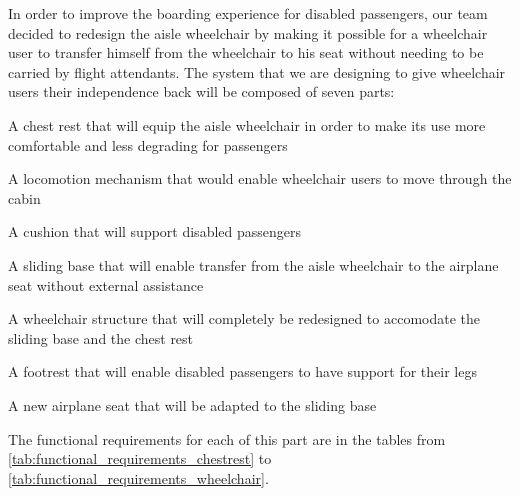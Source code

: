 In order to improve the boarding experience for disabled passengers, our team decided to redesign the aisle wheelchair by making it possible for a wheelchair user to transfer himself from the wheelchair to his seat without needing to be carried by flight attendants. The system that we are designing to give wheelchair users their independence back will be composed of seven parts:

\begin{list}{-}{}
  \item A chest rest that will equip the aisle wheelchair in order to make its use more comfortable and less degrading for passengers
  \item A locomotion mechanism that would enable wheelchair users to move through the cabin
  \item A cushion that will support disabled passengers
  \item A sliding base that will enable transfer from the aisle wheelchair to the airplane seat without external assistance
  \item A wheelchair structure that will completely be redesigned to accomodate the sliding base and the chest rest
  \item A footrest that will enable disabled passengers to have support for their legs
  \item A new airplane seat that will be adapted to the sliding base
\end{list}

The functional requirements for each of this part are in the tables from \ref{tab:functional_requirements_chestrest} to \ref{tab:functional_requirements_wheelchair}.

\newpage

\clearpage
\newpage


